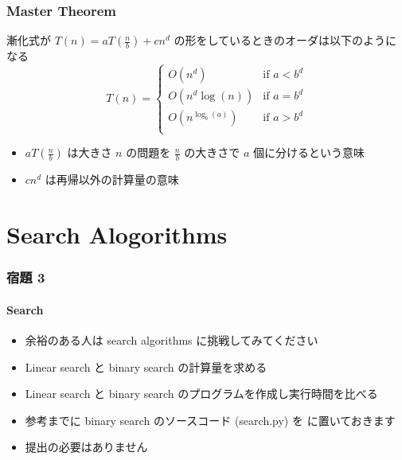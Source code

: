 \begin{frame}
\frametitle{Master Theorem}
  \begin{theorem}
漸化式が \(T(n)=aT(\frac{n}{b})+cn^d\) の形をしているときのオーダは以下のようになる
    \begin{displaymath}
T(n) = \left\{
      \begin{array}{ll}
\displaystyle
O(n^d)&\mbox{if } a<b^d \\
O(n^d\log(n))&\mbox{if } a=b^d \\
O(n^{\log_b(a)})&\mbox{if } a>b^d \\
      \end{array} \right.
    \end{displaymath}
  \end{theorem}
  \begin{itemize}
\item \(aT(\frac{n}{b})\) は大きさ $n$ の問題を \(\frac{n}{b}\) の大きさで $a$ 個に分けるという意味
\item \(cn^d\) は再帰以外の計算量の意味
  \end{itemize}
\end{frame}

\section{Search Alogorithms}
\begin{frame}
\frametitle{宿題 3}
\framesubtitle{Search}
  \begin{itemize}
\item 余裕のある人は search algorithms に挑戦してみてください
\item Linear search と binary search の計算量を求める
\item Linear search と binary search のプログラムを作成し実行時間を比べる
\item 参考までに binary search のソースコード (search.py) を
\href{https://sites.google.com/presystems.xyz/elementaryCS/}{} に置いておきます
\item 提出の必要はありません
  \end{itemize}
\end{frame}
%
%
